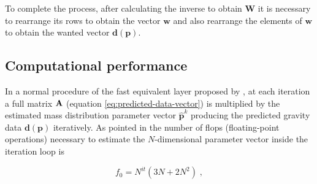 \documentclass[manuscript,revised]{geophysics}
\begin{document}
To complete the process, after calculating the inverse to obtain $\mathbf{W}$ it is necessary to rearrange its rows to obtain the vector $\mathbf{w}$ and also rearrange the elements of $\mathbf{w}$ to obtain the wanted vector $\mathbf{d(p)}$.










\subsection{Computational performance}
In a normal procedure of the fast equivalent layer proposed by \citet{siqueira-etal2017}, at each iteration a full matrix $\tensor{A}$ (equation \ref{eq:predicted-data-vector}) is multiplied by the estimated mass distribution parameter vector $\hat{\mathbf{p}}^k$ producing the predicted gravity data $\mathbf{d(p)}$  iteratively. As pointed in \citet{siqueira-etal2017} the number of flops (floating-point operations) necessary to estimate the $N$-dimensional parameter vector inside the iteration loop is

\begin{equation}
f_0 = N^{it} (3N + 2N^2) \; ,
\label{eq:float_classic}
\end{equation}
\end{document}
